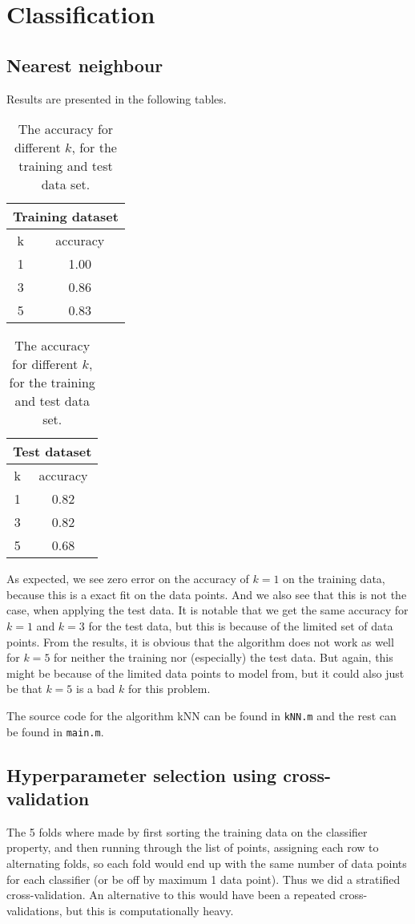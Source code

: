 \documentclass[a4paper, 11pt]{article}
\begin{document}
\section{Classification}
\label{sec:classification}

\subsection{Nearest neighbour}
\label{sub:nearest_neighbour}
Results are presented in the following tables.
\begin{table}[H]
    \centering
    \begin{tabular}{c|c}
        \multicolumn{2}{c}{Training dataset} \\ \toprule
        k & accuracy \\ \hline
        1 & 1.00 \\
        3 & 0.86 \\
        5 & 0.83
    \end{tabular}
    \quad
    \begin{tabular}{c|c}
        \multicolumn{2}{c}{Test dataset} \\ \toprule
        k & accuracy \\ \hline
        1 & 0.82 \\
        3 & 0.82 \\
        5 & 0.68
    \end{tabular}
    \caption{The accuracy for different $k$, for the training and test data set.}
    \label{tab:accuracy}
\end{table}

As expected, we see zero error on the accuracy of $k=1$ on the training data, because this is a exact fit on the data points. And we also see that this is not the case, when applying the test data. It is notable that we get the same accuracy for $k=1$ and $k=3$ for the test data, but this is because of the limited set of data points. From the results, it is obvious that the algorithm does not work as well for $k=5$ for neither the training nor (especially) the test data. But again, this might be because of the limited data points to model from, but it could also just be that $k=5$ is a bad $k$ for this problem.

The source code for the algorithm kNN can be found in \texttt{kNN.m} and the rest can be found in \texttt{main.m}.

\subsection{Hyperparameter selection using cross-validation}
\label{sub:hyperparameter_selection_using_cross_validation}
The 5 folds where made by first sorting the training data on the classifier property, and then running through the list of points, assigning each row to alternating folds, so each fold would end up with the same number of data points for each classifier (or be off by maximum 1 data point). Thus we did a stratified cross-validation. An alternative to this would have been a repeated cross-validations, but this is computationally heavy.
\end{document}
